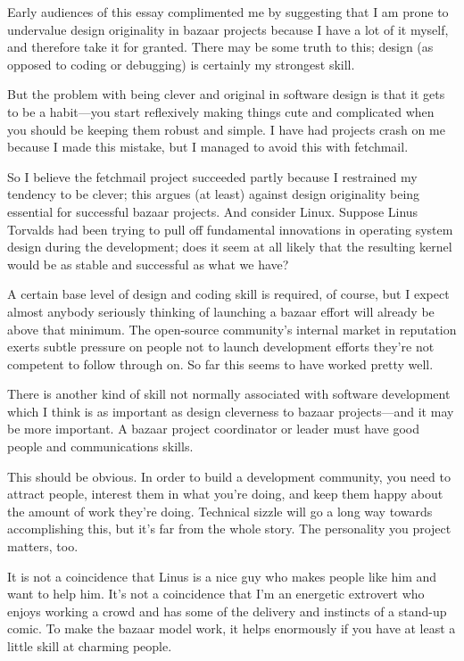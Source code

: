 \documentclass[a4paper,12pt,UTF8,twoside]{ctexbook}
\begin{document}
Early audiences of this essay complimented me by suggesting that I am prone to undervalue design originality in bazaar projects because I have a lot of it myself, and therefore take it for granted. There may be some truth to this; design (as opposed to coding or debugging) is certainly my strongest skill.

But the problem with being clever and original in software design is that it gets to be a habit—you start reflexively making things cute and complicated when you should be keeping them robust and simple. I have had projects crash on me because I made this mistake, but I managed to avoid this with fetchmail.

So I believe the fetchmail project succeeded partly because I restrained my tendency to be clever; this argues (at least) against design originality being essential for successful bazaar projects. And consider Linux. Suppose Linus Torvalds had been trying to pull off fundamental innovations in operating system design during the development; does it seem at all likely that the resulting kernel would be as stable and successful as what we have?

A certain base level of design and coding skill is required, of course, but I expect almost anybody seriously thinking of launching a bazaar effort will already be above that minimum. The open-source community's internal market in reputation exerts subtle pressure on people not to launch development efforts they're not competent to follow through on. So far this seems to have worked pretty well.

There is another kind of skill not normally associated with software development which I think is as important as design cleverness to bazaar projects—and it may be more important. A bazaar project coordinator or leader must have good people and communications skills.

This should be obvious. In order to build a development community, you need to attract people, interest them in what you're doing, and keep them happy about the amount of work they're doing. Technical sizzle will go a long way towards accomplishing this, but it's far from the whole story. The personality you project matters, too.

It is not a coincidence that Linus is a nice guy who makes people like him and want to help him. It's not a coincidence that I'm an energetic extrovert who enjoys working a crowd and has some of the delivery and instincts of a stand-up comic. To make the bazaar model work, it helps enormously if you have at least a little skill at charming people.
\end{document}
